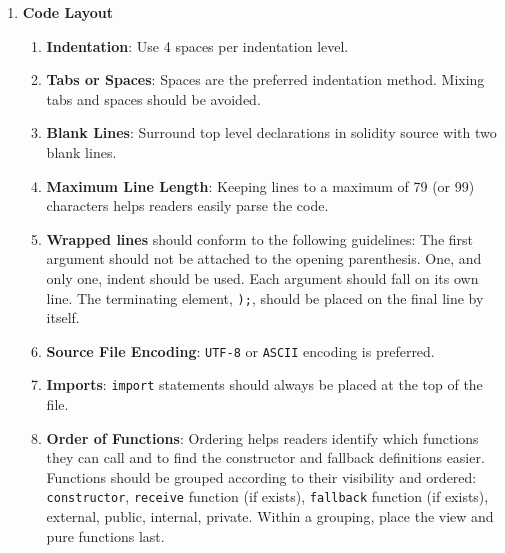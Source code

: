 \begin{enumerate}
\item\textbf{Code Layout}
    \begin{enumerate}
    \item\textbf{Indentation}: Use 4 spaces per indentation level.
    \item\textbf{Tabs or Spaces}: Spaces are the preferred indentation method. Mixing tabs and spaces should be avoided.
    \item\textbf{Blank Lines}: Surround top level declarations in solidity source with two blank lines.
    \item\textbf{Maximum Line Length}: Keeping lines to a maximum of 79 (or 99) characters helps readers easily parse the code.
    \item\textbf{Wrapped lines} should conform to the following guidelines: The first argument should not be attached to the opening parenthesis. One, and only one, indent should be used. Each argument should fall on its own line. The terminating element, \verb|);|, should be placed on the final line by itself.
    \item\textbf{Source File Encoding}: \verb|UTF-8| or \verb|ASCII| encoding is preferred.
    \item\textbf{Imports}: \verb|import| statements should always be placed at the top of the file.
    \item\textbf{Order of Functions}: Ordering helps readers identify which functions they can call and to find the constructor and fallback definitions easier. Functions should be grouped according to their visibility and ordered: \verb|constructor|, \verb|receive| function (if exists), \verb|fallback| function (if exists), external, public, internal, private. Within a grouping, place the view and pure functions last.
    \end{enumerate}


\end{enumerate}
